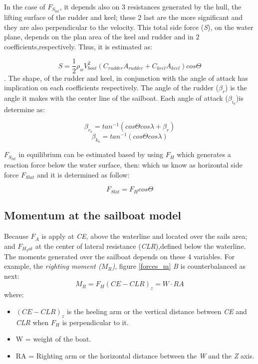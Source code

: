In the case of $F_{S_{lat}}$, it depends also on 3 resistances generated by the hull, the lifting surface of the rudder and keel; these 2 last are the more significant and they are also perpendicular to the velocity. This total side force (\textit{S}), on the water plane, depends on the plan area of the keel and rudder and in 2 coefficients,respectively.  Thus, it is estimated as: \par 
\begin{equation}
    S=\frac{1}{2} \rho_{w} V_{boat}^2(C_{rudder}A_{rudder}+C_{keel}A_{keel})cos \Theta
\end{equation}.
The shape, of the rudder and keel, in conjunction with the angle of attack has implication on each coefficients respectively. %
The angle of the rudder ($\beta_{r}$) is the angle it makes with the center line of the sailboat. Each angle of attack (\textit{$\beta_{i_{a}}$})is determine as: \par 
\begin{equation}
    \beta_{r_{a}}=tan ^{-1} (cos \Theta cos \lambda + \beta_{r})
\end{equation}
\begin{equation}
    \beta_{k_{a}}=tan ^{-1} (cos \Theta cos \lambda )
\end{equation}

$F_{S_{lat}}$ in equilibrium can be estimated based by using $F_{H}$ which generates a reaction force below the water surface, then: %
which us know as horizontal side force $F_{Slat}$ and it is determined as follow: \par
\begin{equation}
    F_{Slat}= F_{H}cos \Theta
\end{equation}

\subsection{Momentum at the sailboat model} \label{sec:momentum_types}
Because $F_{A}$ is apply at \textit{CE}, above the waterline and located over the sails area; and $F_{H_Tot}$ at the center of lateral resistance (\textit{CLR}),defined below the waterline. The moments generated over the sailboat depends on these 4 variables. For example, the \textit{righting moment ($M_{R}$)}, figure \ref{forces_m} \textit{B} is counterbalanced as next: 
\begin{equation}\label{eq:right_mom}
    M_{R}=F_{H}(CE-CLR)_{z}=W \cdot RA
\end{equation}
where:\par
\begin{itemize}
    \item $(CE-CLR)_{z}$ is the heeling arm or the vertical distance between \textit{CE} and \textit{CLR} when $F_{H}$ is perpendicular to it.
    \item W = weight of the boat.
    \item RA = Righting arm or the horizontal distance between the \textit{W} and the \textit{Z} axis.
\end{itemize}

